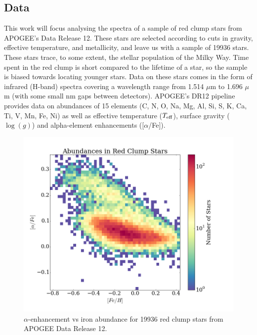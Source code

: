\documentclass[manuscript]{aastex}
\begin{document}
\subsection{Data}
This work will focus analysing the spectra of a sample of red clump stars from APOGEE's Data Release 12. These stars are selected according to cuts in gravity, effective temperature, and metallicity, and leave us with a sample of 19936 stars. These stars trace, to some extent, the stellar population of the Milky Way. Time spent in the red clump is short compared to the lifetime of a star, so the sample is biased towards locating younger stars. Data on these stars comes in the form of infrared (H-band) spectra covering a wavelength range from 1.514 $\mu$m to 1.696 $\mu$m (with some small nm gaps between detectors). APOGEE's DR12 pipeline provides data on abundances of 15 elements (C, N, O, Na, Mg, Al, Si, S, K, Ca, Ti, V, Mn, Fe, Ni) as well as effective temperature ($T_{\rm eff}$), surface gravity ($\log(g)$) and alpha-element enhancements ([$\alpha$/Fe]).

\begin{figure}[H]
\centering
\includegraphics[width = \linewidth]{alpha_vs_fe.png}
\caption{$\alpha$-enhancement vs iron abundance for 19936 red clump stars from APOGEE Data Release 12.}
\label{fig:abun}
\end{figure}
\end{document}

